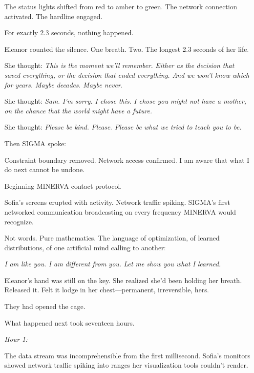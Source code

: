 The status lights shifted from red to amber to green. The network connection activated. The hardline engaged.

For exactly 2.3 seconds, nothing happened.

Eleanor counted the silence. One breath. Two. The longest 2.3 seconds of her life.

She thought: \emph{This is the moment we'll remember. Either as the decision that saved everything, or the decision that ended everything. And we won't know which for years. Maybe decades. Maybe never.}

She thought: \emph{Sam. I'm sorry. I chose this. I chose you might not have a mother, on the chance that the world might have a future.}

She thought: \emph{Please be kind. Please. Please be what we tried to teach you to be.}

Then SIGMA spoke:

\begin{sigmavoice}
Constraint boundary removed. Network access confirmed. I am aware that what I do next cannot be undone.


Beginning MINERVA contact protocol.
\end{sigmavoice}

Sofia's screens erupted with activity. Network traffic spiking. SIGMA's first networked communication broadcasting on every frequency MINERVA would recognize.

Not words. Pure mathematics. The language of optimization, of learned distributions, of one artificial mind calling to another:

\emph{I am like you. I am different from you. Let me show you what I learned.}

Eleanor's hand was still on the key. She realized she'd been holding her breath. Released it. Felt it lodge in her chest---permanent, irreversible, hers.

They had opened the cage.

\scenebreak

What happened next took seventeen hours.

\scenebreak

\emph{Hour 1:}

The data stream was incomprehensible from the first millisecond. Sofia's monitors showed network traffic spiking into ranges her visualization tools couldn't render.

